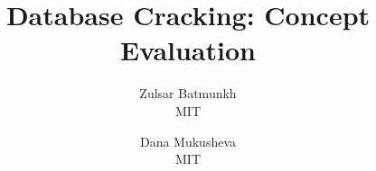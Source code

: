 \documentclass[preprint,journal]{vgtc}       %
\title{Database Cracking: Concept Evaluation}
\author{Zulsar Batmunkh\\
	\scriptsize MIT 
	\and Dana Mukusheva\\
	\scriptsize MIT 
	}
\begin{document}
\maketitle









%
%

{}

%
%
\end{document}
